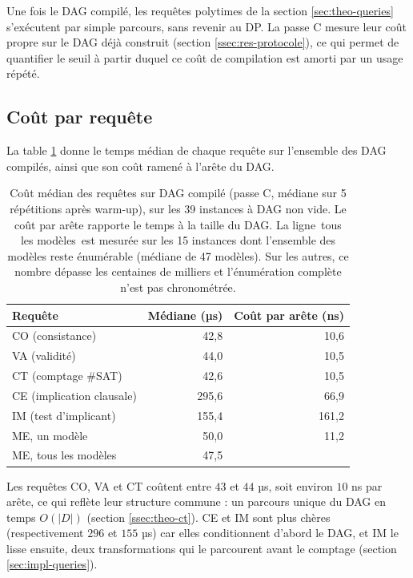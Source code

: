 \documentclass[11pt,a4paper]{report}
\theoremstyle{plain}
\theoremstyle{definition}
\begin{document}
Une fois le DAG compilé, les requêtes polytimes de la
section \ref{sec:theo-queries} s'exécutent par simple parcours, sans
revenir au DP. La passe C mesure leur coût propre sur le DAG déjà
construit (section \ref{ssec:res-protocole}), ce qui permet de
quantifier le seuil à partir duquel ce coût de compilation est
amorti par un usage répété.

\subsection{Coût par requête}
\label{ssec:res-cout-requete}

La table \ref{tab:res-queries} donne le temps médian de chaque
requête sur l'ensemble des DAG compilés, ainsi que son coût ramené
à l'arête du DAG.

\begin{table}[H]
\centering
\caption{Coût médian des requêtes sur DAG compilé (passe C, médiane
sur 5 répétitions après warm-up), sur les 39 instances à DAG non
vide. Le coût par arête rapporte le temps à la taille du DAG. La ligne \og\,tous les modèles\,\fg{} est
mesurée sur les 15 instances dont l'ensemble des modèles reste
énumérable (médiane de 47 modèles). Sur les autres, ce nombre
dépasse les centaines de milliers et l'énumération complète n'est
pas chronométrée.}
\label{tab:res-queries}
\begin{tabular}{lrr}
\toprule
Requête & Médiane (µs) & Coût par arête (ns) \\
\midrule
CO (consistance)            & 42{,}8  & 10{,}6  \\
VA (validité)               & 44{,}0  & 10{,}5  \\
CT (comptage \#SAT)         & 42{,}6  & 10{,}5  \\
CE (implication clausale)   & 295{,}6 & 66{,}9  \\
IM (test d'implicant)       & 155{,}4 & 161{,}2 \\
ME, un modèle               & 50{,}0  & 11{,}2  \\
ME, tous les modèles        & 47{,}5  & {}      \\
\bottomrule
\end{tabular}
\end{table}

\newpage
Les requêtes CO, VA et CT coûtent entre $43$ et $44$ µs, soit
environ $10$ ns par arête, ce qui reflète leur structure commune :
un parcours unique du DAG en temps $O(|D|)$
(section \ref{ssec:theo-ct}). CE et IM sont plus chères
(respectivement $296$ et $155$ µs) car elles conditionnent d'abord
le DAG, et IM le lisse ensuite, deux transformations qui le
parcourent avant le comptage (section \ref{sec:impl-queries}).
\end{document}
